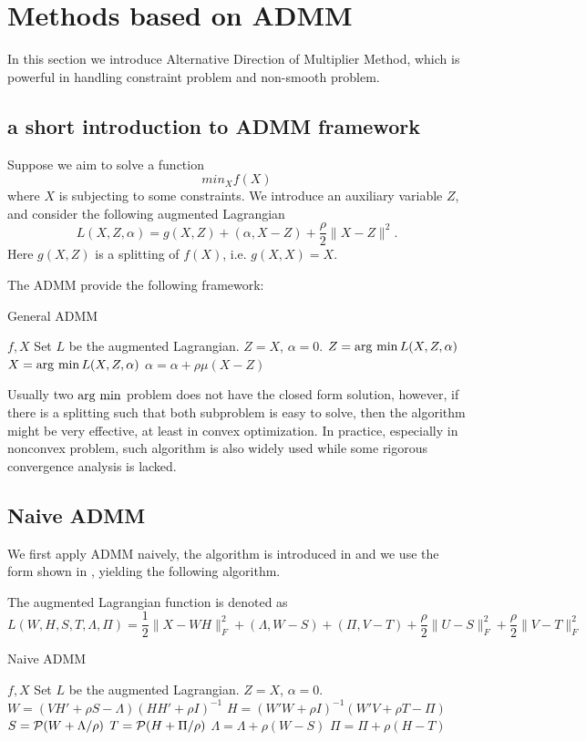 \documentclass{article}
\begin{document}
\section{Methods based on ADMM}
In this section we introduce Alternative Direction of Multiplier Method, which is powerful in handling constraint problem and non-smooth problem.
\subsection{a short introduction to ADMM framework}
Suppose we aim to solve a function 
$$min_X f(X)$$
where $X$ is subjecting to some constraints. We introduce an auxiliary variable $Z$, and consider the following augmented Lagrangian
$$L(X,Z,\alpha) = g(X,Z) + (\alpha, X-Z) + \frac{\rho}{2} \|X-Z\|^2.$$
Here $g(X,Z)$ is a splitting of $f(X)$, i.e. $g(X,X) = X$.

The ADMM provide the following framework:
\begin{algorithm}
	\caption{General ADMM}
	\begin{algorithmic}[1]
	\REQUIRE $f, X$
	\STATE Set $L$ be the augmented Lagrangian.
	\STATE $Z = X$, $\alpha = 0$.
	\STATE $Z = \argmin L(X,Z,\alpha)$
	\STATE $X = \argmin L(X,Z,\alpha)$
	\STATE $\alpha = \alpha + \rho\mu(X-Z)$
	\ENDWHILE
	\end{algorithmic}
\end{algorithm}
Usually two $\argmin$ problem does not have the closed form solution, however, if there is a splitting such that both subproblem is easy to solve, then the algorithm might be very effective, at least in convex optimization. In practice, especially in nonconvex problem, such algorithm is also widely used while some rigorous convergence analysis is lacked.


\subsection{Naive ADMM}
We first apply ADMM naively, the algorithm is introduced in \cite{CITE} and we use the form shown in \cite{rk1admm}, yielding the following algorithm.

The augmented Lagrangian function is denoted as 
$$L(W,H,S,T,\Lambda, \Pi) = \frac{1}{2} \|X - WH\|_F^2 +  (\Lambda, W-S) + (\Pi, V-T) + \frac{\rho}{2}\|U-S\|_F^2 + \frac{\rho}{2} \|V-T\|_F^2$$

\begin{algorithm}
	\caption{Naive ADMM}
	\begin{algorithmic}[1]
		\REQUIRE $f, X$
		\STATE Set $L$ be the augmented Lagrangian.
		\STATE $Z = X$, $\alpha = 0$.
    \STATE $W = (VH'+\rho S-\Lambda)(HH'+\rho I)^{-1}$
\STATE $H = (W'W+\rho I)^{-1}(W'V+\rho T-\Pi)$
\STATE $S = \P(W + \Lambda/\rho)$
\STATE $T = \P(H + \Pi/\rho)$
\STATE $\Lambda = \Lambda + \rho(W-S)$
\STATE $\Pi = \Pi + \rho(H-T)$
		\ENDWHILE
	\end{algorithmic}
\end{algorithm}
\end{document}
